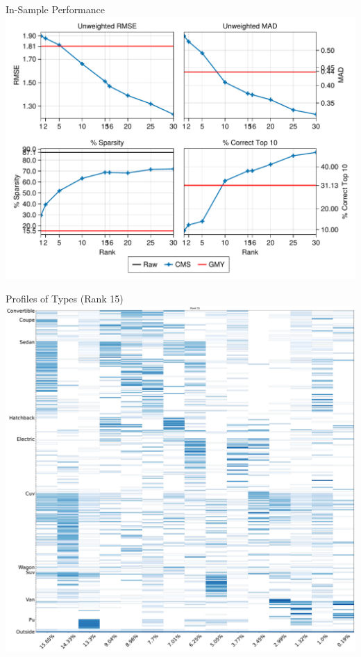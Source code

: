 \begin{frame}{In-Sample Performance}
\label{in_sample}
\centering
\includegraphics[height=\textheight,width=\textwidth, keepaspectratio]{resources/insample-comparison-all.pdf}\\
\end{frame}


\begin{frame}{Profiles of Types (Rank 15)}
\centering
\includegraphics[height=0.95\textheight]{resources/hpc_rank_15_profiles}
\end{frame}

